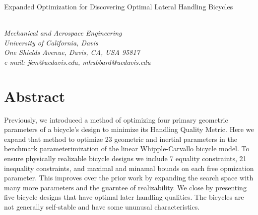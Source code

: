 \documentclass{bmd2019a}
\begin{document}
\begin{flushleft}
{\fontsize{16pt}{20pt}\selectfont%
  Expanded Optimization for Discovering Optimal Lateral Handling Bicycles}
\end{flushleft}

\begin{flushleft}
  {\\}
  \textit{Mechanical and Aerospace Engineering\\
          University of California, Davis\\
          One Shields Avenue, Davis, CA, USA 95817\\
          e-mail: jkm@ucdavis.edu, mhubbard@ucdavis.edu}
\end{flushleft}


\section*{Abstract}
%
Previously, we introduced a method of optimizing four primary geometric
parameters of a bicycle's design to minimize its Handling Quality Metric. Here
we expand that method to optimize 23 geometric and inertial parameters in the
benchmark parameterimization of the linear Whipple-Carvallo bicycle model. To
ensure physically realizable bicycle designs we include 7 equality constraints,
21 inequality constraints, and maximal and minamal bounds on each free
opmization parameter. This improves over the prior work by expanding the search
space with many more parameters and the guarntee of realizability. We close by
presenting five bicycle designs that have optimal later handling qualities. The
bicycles are not generally self-stable and have some ununusal characteristics.
\end{document}

